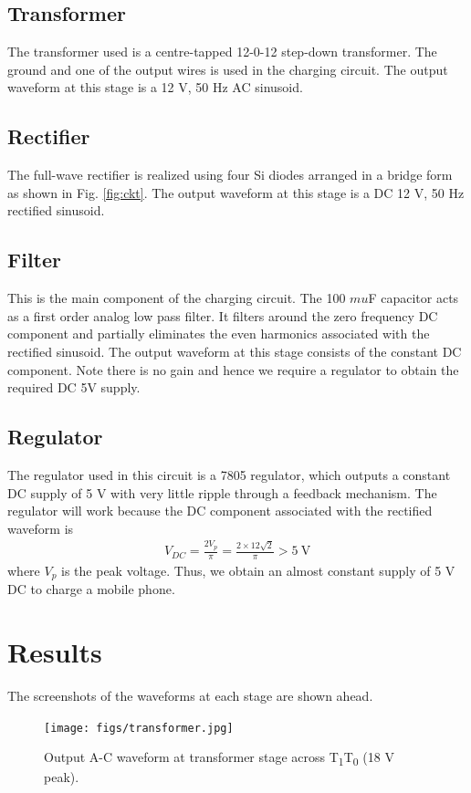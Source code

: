 \documentclass[journal,12pt,twocolumn]{IEEEtran}
\begin{document}
\subsection{Transformer}
The transformer used is a centre-tapped 12-0-12 step-down 
transformer. The ground and one of the output wires is used
in the charging circuit. The output waveform at this stage is
a 12 V, 50 Hz AC sinusoid.

\subsection{Rectifier}
The full-wave rectifier is realized using four Si diodes arranged in a
bridge form as shown in Fig. \ref{fig:ckt}. The output waveform at this
stage is a DC 12 V, 50 Hz rectified sinusoid.

\subsection{Filter}
This is the main component of the charging circuit. The 100 $mu$F
capacitor acts as a first order analog low pass filter. It filters
around the zero frequency DC component and partially eliminates the
even harmonics associated with the rectified sinusoid. The output 
waveform at this stage consists of the constant DC component. Note
there is no gain and hence we require a regulator to obtain the
required DC 5V supply.

\subsection{Regulator}
The regulator used in this circuit is a 7805 regulator, which outputs
a constant DC supply of 5 V with very little ripple through a 
feedback mechanism. The regulator will work because the DC component 
associated with the rectified waveform is
\begin{align}
    V_{DC} = \frac{2V_p}{\pi} = \frac{2\times12\sqrt{2}}{\pi} > \SI{5}{\V}
\end{align}
where $V_p$ is the peak voltage. Thus, we obtain an almost
constant supply of 5 V DC to charge a mobile phone.

\section{Results}
The screenshots of the waveforms at each stage are shown ahead.

\begin{figure}[!ht]
    \texttt{[image: figs/transformer.jpg]}
    \caption{Output A-C waveform at transformer stage across T\textsubscript{1}T\textsubscript{0} (18 V peak).}
    \label{fig:transformer}
\end{figure}
\end{document}
